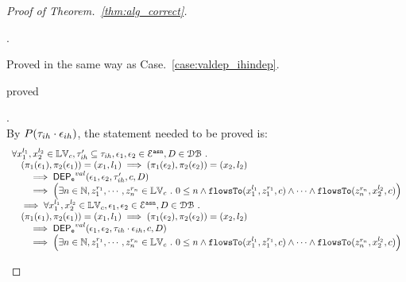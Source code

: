 \begin{proof}[Proof of Theorem.~\ref{thm:alg_correct}]
\begin{case}
\begin{subcase}
\begin{subsubcase}
\end{subsubcase}
\begin{subsubcase}.
\begin{subsubsubcase}
Proved in the same way as Case.~\ref{case:valdep_ihindep}.
\end{subsubsubcase}
\begin{subsubsubcase}
proved 
\end{subsubsubcase}
\end{subsubcase}
\end{subcase}
\end{case}
\begin{case}
\label{case:valdep_ih}.
\\
%
By $P(\mathtt{\tau}_{ih} \cdot \mathtt{\epsilon}_{ih})$, the statement needed to be proved is:
$$
\begin{array}{l}
\forall {x}_1^{l_1}, {x}_2^{l_2} \in \mathbb{LV}_{{c}}, \mathtt{\tau}_{ih}' \subseteq \mathtt{\tau}_{ih},
\mathtt{\epsilon}_1, \mathtt{\epsilon}_2 \in \mathcal{E}^{\mathtt{{asn}}}, D \in \mathcal{DB} ~.~
\\ \quad
(\pi_{1}{(\mathtt{\epsilon}_1)}, \pi_{2}{(\mathtt{\epsilon}_1)}) = ({x}_1, l_1)
\implies
(\pi_{1}{(\mathtt{\epsilon}_2)}, \pi_{2}{(\mathtt{\epsilon}_2)}) = ({x}_2, l_2)
 \\ \qquad \implies 
\mathsf{DEP_{\mathtt{e}}}^{val}(\mathtt{\epsilon}_1, \mathtt{\epsilon}_2, \mathtt{\tau}_{ih}', c, D)
 \\ \qquad \implies
   \Big(\exists  n \in \mathbb{N}, z_1^{r_1}, \cdots, z_n^{r_n} \in \mathbb{LV}_{{c}} ~.~ 0 \leq n
 \land \mathtt{flowsTo}(x_1^{l_1}, z_1^{r_1}, c) \land \cdots \land \mathtt{flowsTo}(z_n^{r_n}, {x}_2^{l_2}, c) \Big)
\\ \quad \implies
\forall {x}_1^{l_1}, {x}_2^{l_2} \in \mathbb{LV}_{{c}},
\mathtt{\epsilon}_1, \mathtt{\epsilon}_2 \in \mathcal{E}^{\mathtt{{asn}}}, D \in \mathcal{DB} ~.~
\\ \quad
(\pi_{1}{(\mathtt{\epsilon}_1)}, \pi_{2}{(\mathtt{\epsilon}_1)}) = ({x}_1, l_1)
\implies
(\pi_{1}{(\mathtt{\epsilon}_2)}, \pi_{2}{(\mathtt{\epsilon}_2)}) = ({x}_2, l_2)
 \\ \qquad \implies 
\mathsf{DEP_{\mathtt{e}}}^{val}(\mathtt{\epsilon}_1, \mathtt{\epsilon}_2, \mathtt{\tau}_{ih} \cdot \mathtt{\epsilon}_{ih}, c, D)
 \\ \qquad \implies
   \Big(\exists  n \in \mathbb{N}, z_1^{r_1}, \cdots, z_n^{r_n} \in \mathbb{LV}_{{c}} ~.~ 0 \leq n
 \land \mathtt{flowsTo}(x_1^{l_1}, z_1^{r_1}, c) \land \cdots \land \mathtt{flowsTo}(z_n^{r_n}, {x}_2^{l_2}, c) \Big)
\end{array}
$$
%
\begin{subcase}

\end{subcase}
\end{case}
\end{proof}
